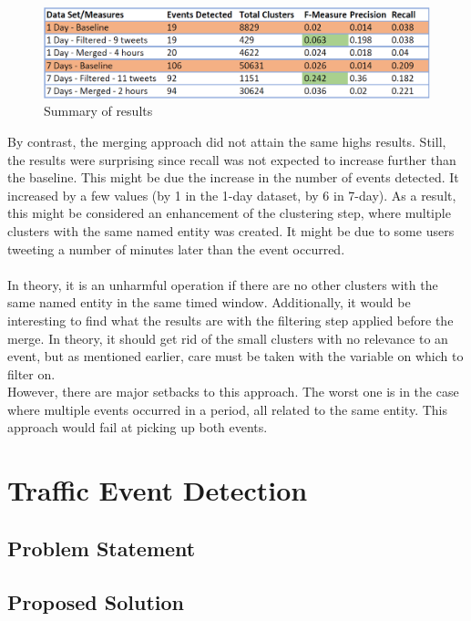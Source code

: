 \documentclass[a4paper,portrait,12pt]{article}
\begin{document}
\begin{figure}[h!]
	\centering
	\includegraphics[width=\linewidth]{images/summary.png}
	\caption{Summary of results}
	\label{fig:summary}
\end{figure}

By contrast, the merging approach did not attain the same highs results.
Still, the results were surprising since recall was not expected to increase further than the baseline.
This might be due the increase in the number of events detected.
It increased by a few values (by 1 in the 1-day dataset, by 6 in 7-day).
As a result, this might be considered an enhancement of the clustering step, where multiple clusters with the same named entity was created. 
It might be due to some users tweeting a number of minutes later than the event occurred.
\\\\
In theory, it is an unharmful operation if there are no other clusters with the same named entity in the same timed window.
Additionally, it would be interesting to find what the results are with the filtering step applied before the merge.
In theory, it should get rid of the small clusters with no relevance to an event, but as mentioned earlier, care must be taken with the variable on which to filter on.
\\
However, there are major setbacks to this approach.
The worst one is in the case where multiple events occurred in a period, all related to the same entity. 
This approach would fail at picking up both events. 

\section{Traffic Event Detection}
\subsection{Problem Statement}
\subsection{Proposed Solution}
\end{document}
